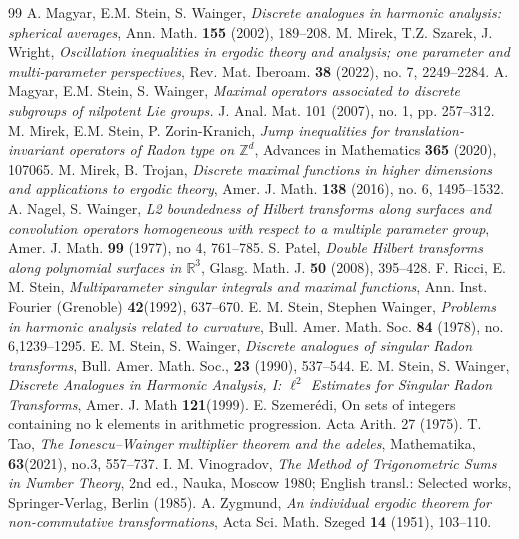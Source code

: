 \documentclass[10pt,a4paper]{amsart}
\numberwithin{equation}{section}
\begin{document}
\begin{thebibliography}{99}
 A. Magyar, E.M. Stein, S. Wainger, \emph{Discrete analogues in harmonic analysis: spherical averages}, Ann. Math. \textbf{155} (2002), 189--208.
 M. Mirek, T.Z. Szarek, J. Wright, \emph{Oscillation inequalities in ergodic theory and analysis; one parameter and multi-parameter perspectives}, Rev. Mat. Iberoam. \textbf{38} (2022), no. 7, 2249--2284.
 A. Magyar, E.M. Stein, S. Wainger, \emph{Maximal operators associated to discrete subgroups of nilpotent Lie groups. } J. Anal. Mat. 101 (2007), no. 1, pp. 257–312.
 M. Mirek, E.M. Stein, P. Zorin-Kranich, \emph{Jump inequalities for translation-invariant operators of Radon type on $\mathbb{Z}^d$}, Advances in Mathematics \textbf{365} (2020), 107065.
 M. Mirek, B. Trojan, \emph{Discrete maximal functions in higher dimensions and applications to ergodic theory}, Amer. J. Math. \textbf{138} (2016), no. 6, 1495--1532.
 A. Nagel, S. Wainger, \emph{L2 boundedness of Hilbert transforms along surfaces and convolution operators homogeneous with respect to a multiple parameter group}, Amer. J. Math. \textbf{99} (1977), no 4, 761--785.
 S. Patel, \emph{Double Hilbert transforms along polynomial surfaces in $\mathbb{R}^3$}, {Glasg. Math. J.} \textbf{50} (2008), 395--428.
 F. Ricci, E. M. Stein, \emph{Multiparameter singular integrals and maximal functions}, Ann. Inst. Fourier (Grenoble) \textbf{42}(1992), 637--670.
 E. M. Stein, Stephen Wainger, \emph{Problems in harmonic analysis related to curvature}, Bull. Amer. Math. Soc. \textbf{84} (1978), no. 6,1239--1295.
 E. M. Stein, S. Wainger, \emph{Discrete analogues of singular Radon transforms}, Bull. Amer. Math. Soc., \textbf{23} (1990), 537–544.
 E. M. Stein, S. Wainger, \emph{Discrete Analogues in Harmonic Analysis, I: $\ell^2$ Estimates for Singular Radon Transforms}, Amer. J. Math \textbf{121}(1999).
 E. Szemerédi, On sets of integers containing no k elements in arithmetic progression. Acta Arith. 27 (1975).
 T. Tao, \emph{The Ionescu–Wainger multiplier theorem and the adeles}, Mathematika, \textbf{63}(2021), no.3, 557--737.
 I. M. Vinogradov, \emph{The Method of Trigonometric Sums in Number Theory}, 2nd ed., Nauka, Moscow 1980; English transl.: Selected works, Springer-Verlag, Berlin (1985).
 A. Zygmund, \emph{An individual ergodic theorem for non-commutative transformations}, Acta Sci. Math. Szeged \textbf{14} (1951), 103--110.
\end{thebibliography}
\end{document}
